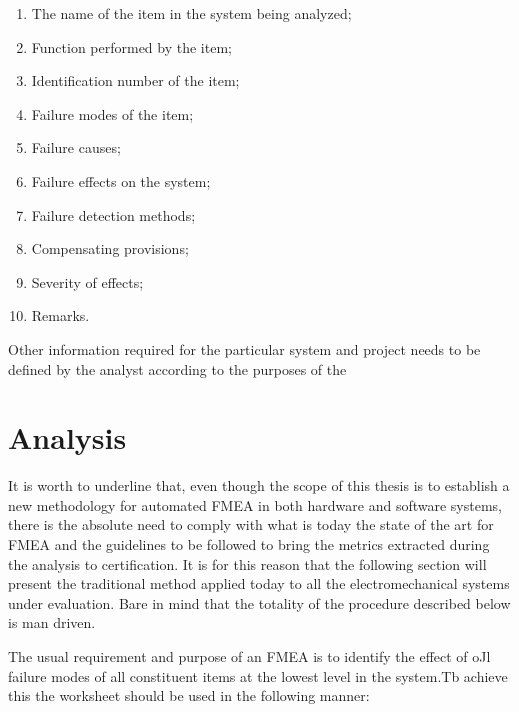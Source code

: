 \documentclass[./dissertation.tex]{subfiles}
\begin{document}
\begin{enumerate}
\item The name of the item in the system being analyzed;
\item Function performed by the item;
\item Identification number of the item;
\item Failure modes of the item;
\item Failure causes;
\item Failure effects on the system;
\item Failure detection methods;
\item Compensating provisions;
\item Severity of effects;
\item Remarks.
\end{enumerate}
Other information required for the particular system and project needs to be defined by the analyst according to the purposes of the



\section{Analysis}
It is worth to underline that, even though the scope of this thesis is to establish a new methodology for automated FMEA in both hardware and software systems, there is the absolute need to comply with what is today the state of the art for FMEA and the guidelines to be followed to bring the metrics extracted during the analysis to certification. It is for this reason that the following section will present the traditional method applied today to all the electromechanical systems under evaluation. Bare in mind that the totality of the procedure described below is man driven.

The usual requirement and purpose of an FMEA is to identify the effect of oJl failure modes of all constituent items at the lowest level in the system.Tb achieve this the worksheet should be used in the following manner:
\end{document}
